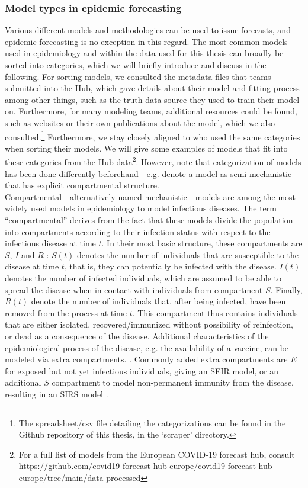 \subsubsection{Model types in epidemic forecasting}
Various different models and methodologies can be used to issue forecasts, and epidemic forecasting is no exception in this regard. The most common models used in epidemiology and within the data used for this thesis can broadly be sorted into categories, which we will briefly introduce and discuss in the following. For sorting models, we consulted the metadata files that teams submitted into the Hub, which gave details about their model and fitting process among other things, such as the truth data source they used to train their model on. Furthermore, for many modeling teams, additional resources could be found, such as websites or their own publications about the model, which we also consulted.\footnote{The spreadsheet/csv file detailing the categorizations can be found in the Github repository of this thesis, in the `scraper' directory.} %
Furthermore, we stay closely aligned to \cite{bracher_pre-registered_2021} who used the same categories when sorting their models. We will give some examples of models that fit into these categories from the Hub data\footnote{For a full list of models from the European COVID-19 forecast hub, consult https://github.com/covid19-forecast-hub-europe/covid19-forecast-hub-europe/tree/main/data-processed}. However, note that categorization of models has been done differently beforehand - e.g. \cite{funk_assessing_nodate} denote a model as semi-mechanistic that has explicit compartmental structure.\\
Compartmental - alternatively named mechanistic - models are among the most widely used models in epidemiology to model infectious diseases. The term ``compartmental'' derives from the fact that these models divide the population into compartments according to their infection status with respect to the infectious disease at time $t$. In their most basic structure, these compartments are $S$, $I$ and $R$ \citep{brauer_epidemic_2012}: $S(t)$ denotes the number of individuals that are susceptible to the disease at time $t$, that is, they can potentially be infected with the disease. $I(t)$ denotes the number of infected individuals, which are assumed to be able to spread the disease when in contact with individuals from compartment $S$. Finally, $R(t)$ denote the number of individuals that, after being infected, have been removed from the process at time $t$. This compartment thus contains individuals that are either isolated, recovered/immunized without possibility of reinfection, or dead as a consequence of the disease. Additional characteristics of the epidemiological process of the disease, e.g. the availability of a vaccine, can be modeled via extra compartments. . Commonly added extra compartments are $E$ for exposed but not yet infectious individuals, giving an SEIR model, or an additional $S$ compartment to model non-permanent immunity from the disease, resulting in an SIRS model \citep{brauer_epidemic_2012}. \\
